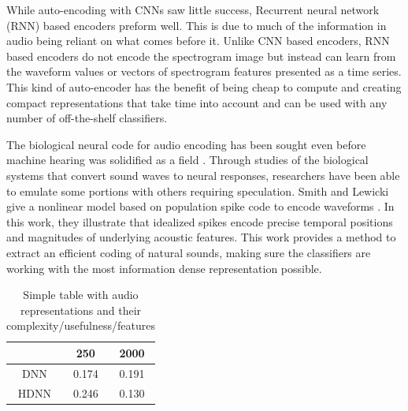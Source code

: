 While auto-encoding with CNNs saw little success, Recurrent neural network (RNN)
based encoders preform well. This is due to much of the information in audio
being reliant on what comes before it. Unlike CNN based encoders, RNN based
encoders do not encode the spectrogram image but instead can learn from the
waveform values or vectors of spectrogram features presented as a time series.
This kind of auto-encoder has the benefit of being cheap to compute and creating
compact representations that take time into account and can be used with any
number of off-the-shelf classifiers.

The biological neural code for audio encoding has been sought even before
machine hearing was solidified as a field \cite{Eggermont2001}. Through studies
of the biological systems that convert sound waves to neural responses,
researchers have been able to emulate some portions with others requiring
speculation. Smith and Lewicki give a nonlinear model based on population spike
code to encode waveforms \cite{smith-efficient-2006}. In this work, they
illustrate that idealized spikes encode precise temporal positions and
magnitudes of underlying acoustic features. This work provides a method to
extract an efficient coding of natural sounds, making sure the classifiers are
working with the most information dense representation possible.

\begin{table}[t]
    \centering
    \begin{tabular}{ccc}
         & 250   & 2000  \\ \hline
    DNN  & 0.174 & 0.191 \\
    HDNN & 0.246 & 0.130
    \end{tabular}
    \caption{Simple table with audio representations and their complexity/usefulness/features}
    \label{tab:audioreps}
\end{table}